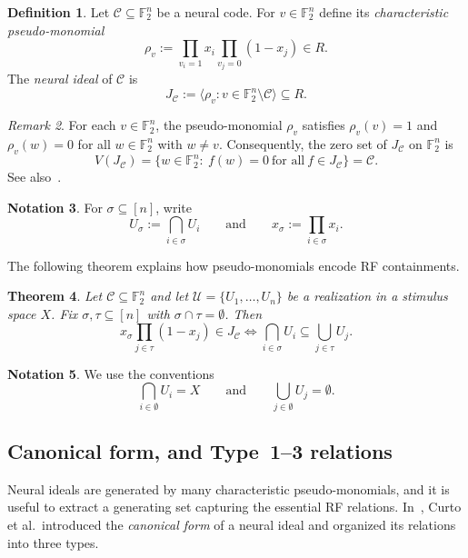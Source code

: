 \documentclass[12pt]{amsart}
\newtheorem{theorem}{Theorem}[section]
\theoremstyle{remark}
\newtheorem{remark}[theorem]{Remark}
\theoremstyle{definition}
\newtheorem{definition}[theorem]{Definition}
\newtheorem{notation}[theorem]{Notation}
\newcommand{\F}{\mathbb{F}}
\newcommand{\C}{\mathcal{C}}
\newcommand{\U}{\mathcal{U}}
\begin{document}
\begin{definition}\label{def:neural_ideal}
Let $\C\subseteq\F_2^n$ be a neural code. For $v\in\F_2^n$ define its \emph{characteristic
pseudo-monomial}
\[
\rho_v := \prod_{v_i=1}x_i\prod_{v_j=0}(1-x_j)\in R.
\]
The \emph{neural ideal} of $\C$ is
\[
J_\C := \langle \rho_v : v\in\F_2^n\setminus \C\rangle \subseteq R.
\]
\end{definition}

\begin{remark}\label{rem:boolean-zeroset}
For each $v\in\F_2^n$, the pseudo-monomial $\rho_v$ satisfies $\rho_v(v)=1$ and $\rho_v(w)=0$
for all $w\in\F_2^n$ with $w\neq v$. Consequently, the zero set of $J_\C$ on $\F_2^n$ is
\[
V(J_\C)=\{w\in\F_2^n:\ f(w)=0\ \text{for all}\ f\in J_\C\}=\C.
\]
See also~\cite[Lemma~3.2]{smb}.
\end{remark}

\begin{notation}
For $\sigma\subseteq[n]$, write
\[
U_{\sigma}:=\bigcap_{i\in \sigma} U_i
\qquad \text{and} \qquad
x_\sigma:=\prod_{i\in\sigma}x_i.
\]
\end{notation}

The following theorem explains how pseudo-monomials encode RF containments.

\begin{theorem}\label{thm:rf-neural-ideal}\cite{smb}
Let $\C\subseteq\F_2^n$ and let $\U=\{U_1,\dots,U_n\}$ be a realization in a stimulus space $X$.
Fix $\sigma,\tau\subseteq[n]$ with $\sigma\cap\tau=\emptyset$. Then
\[
x_\sigma\prod_{j\in\tau}(1-x_j)\in J_\C
\iff
\bigcap_{i\in\sigma}U_i \subseteq \bigcup_{j\in\tau}U_j.
\]
\end{theorem}

\begin{notation}
We use the conventions
\[
\bigcap_{i\in\emptyset}U_i=X
\qquad\text{and}\qquad
\bigcup_{j\in\emptyset}U_j=\emptyset.
\]
\end{notation}

\subsection{Canonical form, and Type~1--3 relations}\label{sect:cf}

Neural ideals are generated by many characteristic pseudo-monomials, and it is useful to extract a
generating set capturing the essential RF relations. In~\cite{smb}, Curto et al.\ introduced the
\emph{canonical form} of a neural ideal and organized its relations into three types.
\end{document}

